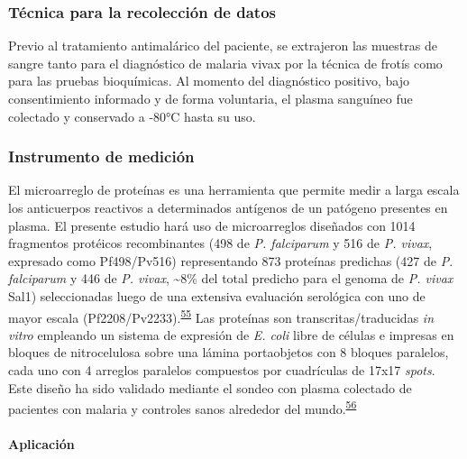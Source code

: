 \documentclass[]{article}
\let\oldparagraph\paragraph
\renewcommand{\paragraph}[1]{\oldparagraph{#1}\mbox{}}
\begin{document}
\subsubsection{Técnica para la recolección de
datos}\label{tecnica-para-la-recoleccion-de-datos}

Previo al tratamiento antimalárico del paciente, se extrajeron las
muestras de sangre tanto para el diagnóstico de malaria vivax por la
técnica de frotís como para las pruebas bioquímicas. Al momento del
diagnóstico positivo, bajo consentimiento informado y de forma
voluntaria, el plasma sanguíneo fue colectado y conservado a -80°C hasta
su uso.

\subsubsection{Instrumento de medición}\label{instrumento-de-medicion}

El microarreglo de proteínas es una herramienta que permite medir a
larga escala los anticuerpos reactivos a determinados antígenos de un
patógeno presentes en plasma. El presente estudio hará uso de
microarreglos diseñados con 1014 fragmentos protéicos recombinantes (498
de \emph{P. falciparum} y 516 de \emph{P. vivax}, expresado como
Pf498/Pv516) representando 873 proteínas predichas (427 de \emph{P.
falciparum} y 446 de \emph{P. vivax}, \textasciitilde{}8\% del total
predicho para el genoma de \emph{P. vivax} Sal1) seleccionadas luego de
una extensiva evaluación serológica con uno de mayor escala
(Pf2208/Pv2233).\textsuperscript{\protect\hyperlink{ref-Finney2014}{55}}
Las proteínas son transcritas/traducidas \emph{in vitro} empleando un
sistema de expresión de \emph{E. coli} libre de células e impresas en
bloques de nitrocelulosa sobre una lámina portaobjetos con 8 bloques
paralelos, cada uno con 4 arreglos paralelos compuestos por cuadrículas
de 17x17 \emph{spots}. Este diseño ha sido validado mediante el sondeo
con plasma colectado de pacientes con malaria y controles sanos
alrededor del
mundo.\textsuperscript{\protect\hyperlink{ref-King2015FOC}{56}}

\paragraph{Aplicación}\label{aplicacion}
\end{document}
